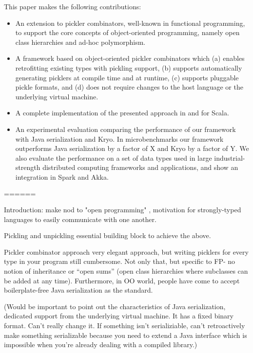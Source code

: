 \documentclass[preprint,10pt]{sigplanconf}
\begin{document}
This paper makes the following contributions:

\begin{itemize}

\item An extension to pickler combinators, well-known in functional
programming,  to support the core concepts of object-oriented programming,
namely open class hierarchies and ad-hoc polymorphism.

\item A framework based on object-oriented pickler combinators which (a)
enables retrofitting existing types with pickling support, (b) supports
automatically generating picklers at compile time and at runtime, (c) supports
pluggable pickle formats, and (d) does not require changes to the host
language or the underlying virtual machine.

\item A complete implementation of the presented approach in and for Scala.

\item An experimental evaluation comparing the performance of our framework
with Java serialization and Kryo. In microbenchmarks our framework outperforms
Java serialization by a factor of X and Kryo by a factor of Y. We also
evaluate the performance on a set of data types used in large industrial-
strength distributed computing frameworks and applications, and show an
integration in Spark and Akka.

\end{itemize}


======

Introduction: make nod to "open programming" \cite{Rossberg2007}, motivation for strongly-typed languages to easily communicate with one another.

Pickling and unpickling essential building block to achieve the above.

Pickler combinator approach \cite{Kennedy2004} very elegant approach, but writing picklers for every type in your program still cumbersome. Not only that, but specific to FP- no notion of inheritance or ``open sums'' (open class hierarchies where subclasses can be added at any time). Furthermore, in OO world, people have come to accept boilerplate-free Java serialization as the standard.

(Would be important to point out the characteristics of Java serialization, dedicated support from the underlying virtual machine. It has a fixed binary format. Can't really change it. If something isn't serializiable, can't retroactively make something serializable because you need to extend a Java interface which is impossible when you're already dealing with a compiled library.)
\end{document}
